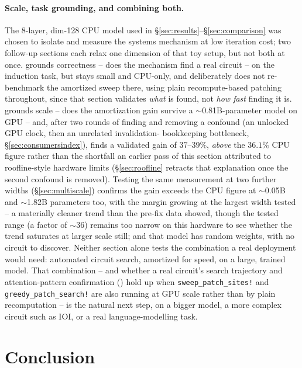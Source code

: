 \documentclass{article}
\begin{document}
\paragraph{Scale, task grounding, and combining both.} The 8-layer, dim-128 CPU model used in
\S\ref{sec:results}--\S\ref{sec:comparison} was chosen to isolate and measure the systems mechanism
at low iteration cost; two follow-up sections each relax one dimension of that toy setup, but not
both at once.  grounds correctness -- does the mechanism find a real circuit --
on the induction task, but stays small and CPU-only, and deliberately does not re-benchmark the
amortized sweep there, using plain recompute-based patching throughout, since that section
validates \emph{what} is found, not \emph{how fast} finding it is.  grounds
scale -- does the amortization gain survive a $\sim$0.81B-parameter model on GPU -- and, after two
rounds of finding and removing a confound (an unlocked GPU clock, then an unrelated invalidation-
bookkeeping bottleneck, \S\ref{sec:consumersindex}), finds a validated gain of $37$--$39\%$,
\emph{above} the $36.1\%$ CPU figure rather than the shortfall an earlier pass of this section
attributed to roofline-style hardware limits (\S\ref{sec:roofline} retracts that explanation once
the second confound is removed). Testing the same measurement at two further widths
(\S\ref{sec:multiscale}) confirms the gain exceeds the CPU figure at $\sim$0.05B and $\sim$1.82B
parameters too, with the margin growing at the largest width tested -- a materially cleaner trend
than the pre-fix data showed, though the tested range (a factor of $\sim$36) remains too narrow on
this hardware to see whether the trend saturates at larger scale still; and that model has random
weights, with no circuit to discover. Neither section
alone tests the combination a real deployment would need: automated circuit search, amortized for
speed, on a large, trained model. That combination -- and whether a real circuit's search
trajectory and attention-pattern confirmation () hold up when \texttt{sweep\_patch\_sites!}
and \texttt{greedy\_patch\_search!} are also running at GPU scale rather than by plain
recomputation -- is the natural next step, on a bigger model, a more complex circuit such as IOI,
or a real language-modelling task.

\section{Conclusion}
\label{sec:conclusion}
\end{document}
